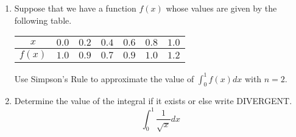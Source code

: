 \documentclass[12pt]{article}
\begin{document}
\begin{enumerate}
\item
Suppose that we have a function $f(x)$ whose values are given by the following table.

\begin{center}
\begin{tabular}{c|c|c|c|c|c|c}
$x$ & $0.0$ & $0.2$ & $0.4$ & $0.6$ & $0.8$ & $1.0$\\\hline
$f(x)$ & $1.0$ & $0.9$ & $0.7$ & $0.9$ & $1.0$ & $1.2$
\end{tabular}
\end{center}

Use Simpson's Rule to approximate the value of $\int_0^1 f(x)dx$ with $n=2$.
\vspace{3in}
\item
Determine the value of the integral if it exists or else write DIVERGENT.
$$\int_0^1 \frac{1}{\sqrt{x}}dx$$
\end{enumerate}
\end{document}
